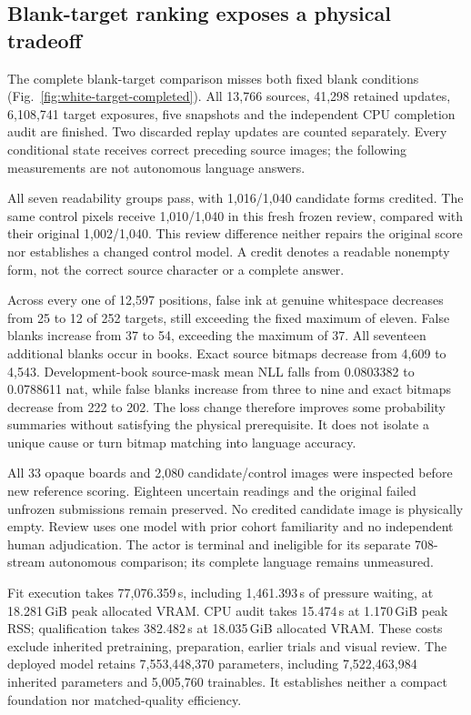 \subsection*{Blank-target ranking exposes a physical tradeoff}

The complete blank-target comparison misses both fixed blank conditions
(Fig.~\ref{fig:white-target-completed}). All 13,766 sources, 41,298 retained
updates, 6,108,741 target exposures, five snapshots and the independent CPU
completion audit are finished. Two discarded replay updates are counted
separately. Every conditional state receives correct preceding source images;
the following measurements are not autonomous language answers.

All seven readability groups pass, with 1,016/1,040 candidate forms credited.
The same control pixels receive 1,010/1,040 in this fresh frozen review, compared
with their original 1,002/1,040. This review difference neither repairs the
original score nor establishes a changed control model. A credit denotes a
readable nonempty form, not the correct source character or a complete answer.

Across every one of 12,597 positions, false ink at genuine whitespace decreases
from 25 to 12 of 252 targets, still exceeding the fixed maximum of eleven.
False blanks increase from 37 to 54, exceeding the maximum of 37. All seventeen
additional blanks occur in books. Exact source bitmaps decrease from 4,609 to
4,543. Development-book source-mask mean NLL falls from 0.0803382 to 0.0788611
nat, while false blanks increase from three to nine and exact bitmaps decrease
from 222 to 202. The loss change therefore improves some probability summaries
without satisfying the physical prerequisite. It does not isolate a unique
cause or turn bitmap matching into language accuracy.

All 33 opaque boards and 2,080 candidate/control images were inspected before
new reference scoring. Eighteen uncertain readings and the original failed
unfrozen submissions remain preserved. No credited candidate image is physically
empty. Review uses one model with prior cohort familiarity and no independent
human adjudication. The actor is terminal and ineligible for its separate
708-stream autonomous comparison; its complete language remains unmeasured.

Fit execution takes 77,076.359\,s, including 1,461.393\,s of pressure waiting,
at 18.281\,GiB peak allocated VRAM. CPU audit takes 15.474\,s at 1.170\,GiB peak
RSS; qualification takes 382.482\,s at 18.035\,GiB allocated VRAM. These costs
exclude inherited pretraining, preparation, earlier trials and visual review.
The deployed model retains 7,553,448,370 parameters, including 7,522,463,984
inherited parameters and 5,005,760 trainables. It establishes neither a compact
foundation nor matched-quality efficiency.
